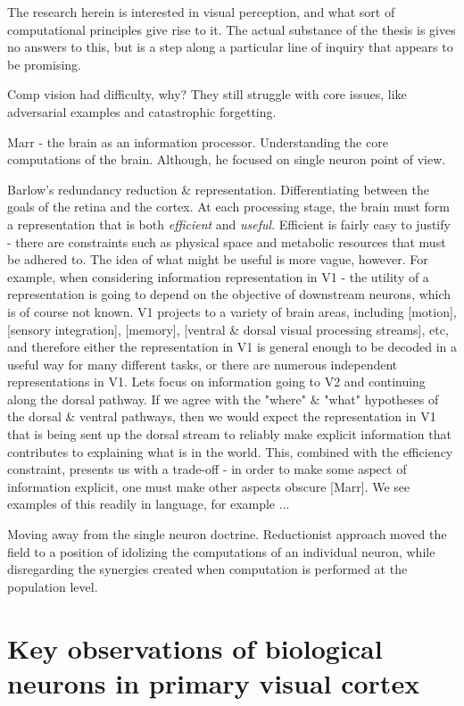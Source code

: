 The research herein is interested in visual perception, and what sort of computational principles give rise to it. The actual substance of the thesis is gives no answers to this, but is a step along a particular line of inquiry that appears to be promising.

Comp vision had difficulty, why? They still struggle with core issues, like adversarial examples and catastrophic forgetting.

Marr - the brain as an information processor. Understanding the core computations of the brain. Although, he focused on single neuron point of view.

Barlow's redundancy reduction \& representation. Differentiating between the goals of the retina and the cortex. At each processing stage, the brain must form a representation that is both \textit{efficient} and \textit{useful}. Efficient is fairly easy to justify - there are constraints such as physical space and metabolic resources that must be adhered to. The idea of what might be useful is more vague, however. For example, when considering information representation in V1 - the utility of a representation is going to depend on the objective of downstream neurons, which is of course not known. V1 projects to a variety of brain areas, including [motion], [sensory integration], [memory], [ventral \& dorsal visual processing streams], etc, and therefore either the representation in V1 is general enough to be decoded in a useful way for many different tasks, or there are numerous independent representations in V1. Lets focus on information going to V2 and continuing along the dorsal pathway. If we agree with the "where" \& "what" hypotheses of the dorsal \& ventral pathways, then we would expect the representation in V1 that is being sent up the dorsal stream to reliably make explicit information that contributes to explaining what is in the world. This, combined with the efficiency constraint, presents us with a trade-off - in order to make some aspect of information explicit, one must make other aspects obscure [Marr]. We see examples of this readily in language, for example ...

Moving away from the single neuron doctrine. Reductionist approach moved the field to a position of idolizing the computations of an individual neuron, while disregarding the synergies created when computation is performed at the population level.


\section{Key observations of biological neurons in primary visual cortex}

